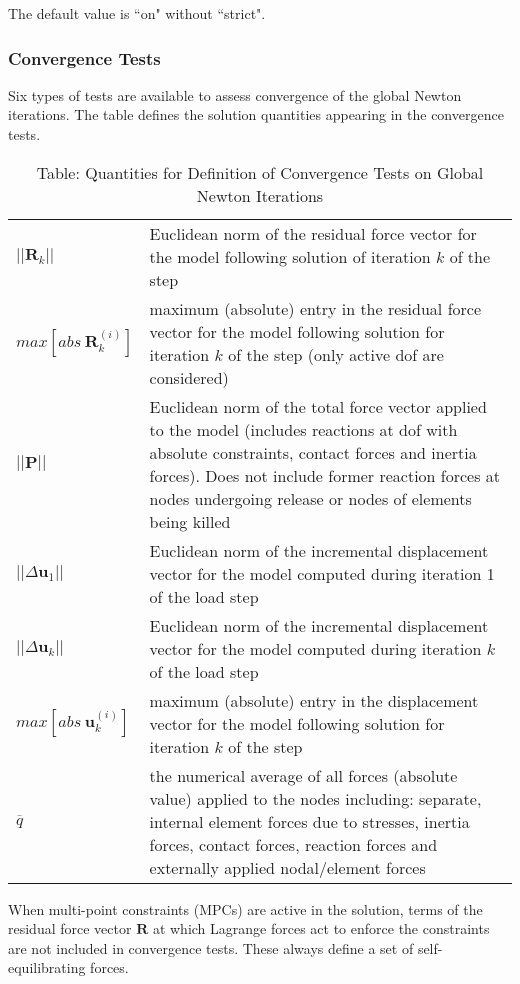 \documentclass[11pt]{report}
\numberwithin{equation}{section}
\newcommand{\nin} {\noindent}
\newcommand{\bmf } {\boldsymbol }  %
\begin{document}
\noindent The default value is ``on" without ``strict".

\subsubsection{Convergence Tests}
\nin Six types of tests are available to assess convergence of the global Newton 
iterations. The table defines the solution quantities appearing in the convergence
tests.
%
\begin{table}[h]	\small
{
\setlength{\extrarowheight}{5.0pt}
\begin{tabular}[htb]{p{1in} p{5in}  }
$||\bmf{R}_k||$ &Euclidean norm of the residual force vector 
for the model following solution of iteration $k$ of the step\\ 
$max\left[abs\ \bmf{R}_k^{(i)} \right]$ & maximum (absolute) entry in the residual
force vector for the model following solution for iteration $k$ of the 
step (only active dof are considered) \\
$||\bmf{P}||$ & Euclidean norm of the total force vector applied to the model 
(includes reactions at dof with absolute constraints, contact forces and inertia forces).
Does not include former reaction
forces at nodes undergoing release or nodes of elements
being killed\\
$||\Delta\bmf{u}_1||$ & Euclidean norm of the incremental displacement vector for 
the model computed during iteration 1 of the load step \\
$||\Delta\bmf{u}_k||$ & Euclidean norm of the incremental displacement vector 
for the model computed during iteration $k$ of the load step\\
$max\left[abs\ \bmf{u}_k^{(i)} \right]$ & maximum (absolute) entry in the displacement 
vector for the model following solution for iteration $k$ of the step\\
$\overline q$ & the numerical average of all forces (absolute value) applied to the nodes
 including: separate, internal element forces due to stresses, inertia forces, contact forces,
reaction forces and externally applied nodal/element forces
\end{tabular}
}
\caption{Table: Quantities for Definition of Convergence Tests on Global Newton Iterations}
 \normalsize	
\end{table}

\nin When multi-point constraints (MPCs) are active in the solution, terms of the 
residual force vector $\bmf{R}$ at which Lagrange forces act to enforce the 
constraints are not included in convergence tests. These 
always define a set of self-equilibrating forces.
\end{document}
